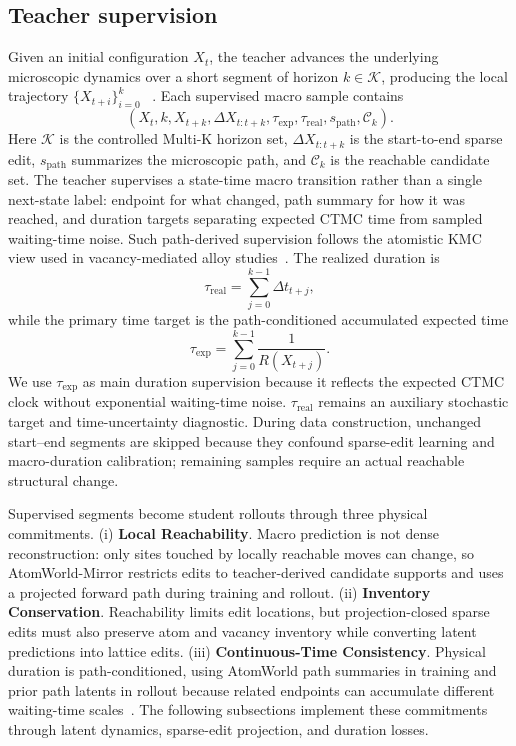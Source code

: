 \documentclass{article}
\begin{document}
\subsection{Teacher supervision}

Given an initial configuration \(X_t\), the teacher advances the underlying
microscopic dynamics over a short segment of horizon \(k\in\mathcal{K}\),
producing the local trajectory \(\{X_{t+i}\}_{i=0}^{k}\)
~\cite{fichthorn1991dmc,chatterjee2007kmc}.
Each supervised macro sample contains
\begin{equation}
(X_t,k,X_{t+k}, \Delta X_{t:t+k}, \tau_{\mathrm{exp}}, \tau_{\mathrm{real}}, s_{\mathrm{path}}, \mathcal{C}_k).
\end{equation}
Here $\mathcal{K}$ is the controlled Multi-K horizon set, $\Delta X_{t:t+k}$ is the start-to-end sparse edit, $s_{\mathrm{path}}$ summarizes the microscopic path, and $\mathcal{C}_k$ is the reachable candidate set. The teacher supervises a state-time macro transition rather than a single next-state label: endpoint for what changed, path summary for how it was reached, and duration targets separating expected CTMC time from sampled waiting-time noise. Such path-derived supervision follows the atomistic KMC view used in vacancy-mediated alloy studies~\cite{soisson1996cufe,soisson2007cufe}. The realized duration is
\begin{equation}
\tau_{\mathrm{real}}=\sum_{j=0}^{k-1}\Delta t_{t+j},
\end{equation}
while the primary time target is the path-conditioned accumulated expected time
\begin{equation}
\tau_{\mathrm{exp}}=\sum_{j=0}^{k-1}\frac{1}{R(X_{t+j})}.
\end{equation}
We use $\tau_{\mathrm{exp}}$ as main duration supervision because it reflects the expected CTMC clock without exponential waiting-time noise. $\tau_{\mathrm{real}}$ remains an auxiliary stochastic target and time-uncertainty diagnostic. During data construction, unchanged start--end segments are skipped because they confound sparse-edit learning and macro-duration calibration; remaining samples require an actual reachable structural change.

Supervised segments become student rollouts through three physical commitments. (i) \textbf{Local Reachability}. Macro prediction is not dense reconstruction: only sites touched by locally reachable moves can change, so AtomWorld-Mirror restricts edits to teacher-derived candidate supports and uses a projected forward path during training and rollout. (ii) \textbf{Inventory Conservation}. Reachability limits edit locations, but projection-closed sparse edits must also preserve atom and vacancy inventory while converting latent predictions into lattice edits. (iii) \textbf{Continuous-Time Consistency}. Physical duration is path-conditioned, using AtomWorld path summaries in training and prior path latents in rollout because related endpoints can accumulate different waiting-time scales~\cite{gillespie1976general,gillespie1977exact,fichthorn1991dmc}. The following subsections implement these commitments through latent dynamics, sparse-edit projection, and duration losses.
\end{document}
